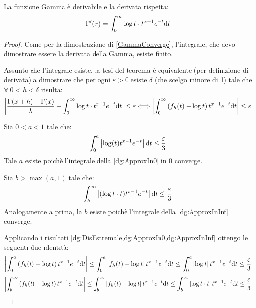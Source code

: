 \begin{theorem}\label{dg:GammaDerivata}
	La funzione Gamma è derivabile e la derivata rispetta:
	\begin{equation*}
		\Gamma'(x)=\int_0^{\infty} \log{t}\cdot t^{x-1}e^{-t}\mathrm{d} t
	\end{equation*}
\end{theorem}
\begin{proof}
	Come per la dimostrazione di \cref{GammaConverge}, l'integrale, che devo dimostrare
	essere la derivata della Gamma, esiste finito.
	
	Assunto che l'integrale esiste, la tesi del teorema è equivalente (per definizione di derivata) a dimostrare
	che per ogni $\varepsilon>0$ esiste $\delta$ (che scelgo minore di 1) tale che $\forall\ 0<h<\delta$ risulta:
	\begin{equation}\label{dg:EpsDeltaDerivata}
		\left\lvert 
		\frac{\Gamma(x+h)-\Gamma(x)}{h}-
		\int_0^{\infty} \log{t}\cdot t^{x-1}e^{-t}\mathrm{d} t
		\right\rvert \le \varepsilon
		\Longleftrightarrow
		\left\lvert
		\int_0^{\infty} \left(f_h(t)-\log{t}\right)t^{x-1}e^{-t}\mathrm{d} t
		\right\rvert \le \varepsilon
	\end{equation}
	
	Sia $0<a<1$ tale che:
	\begin{equation}\label{dg:ApproxIn0}
		\int_0^a \left\lvert \log(t)t^{x-1}e^{-t} \right\rvert \mathrm{d} t \le \frac{\varepsilon}3
	\end{equation}
	Tale $a$ esiste poichè l'integrale della \cref{dg:ApproxIn0} in 0 converge.
	
	Sia $b>\max(a,1)$ tale che:
	\begin{equation}\label{dg:ApproxInInf}
		\int_b^{\infty} \left\lvert (\log{t}\cdot t)t^{x-1}e^{-t}\right\rvert \mathrm{d} t \le \frac{\varepsilon}3
	\end{equation}
	Analogamente a prima, la $b$ esiste poichè l'integrale della \cref{dg:ApproxInInf} converge.
	
	Applicando i risultati \cref{dg:DisEstremale,dg:ApproxIn0,dg:ApproxInInf} ottengo le seguenti due identità:
	\begin{equation}\label{dg:IntIn0}
		\left\lvert \int_0^a \left(f_h(t)-\log{t}\right)t^{x-1}e^{-t}\mathrm{d} t\right\rvert
		\le
		\int_0^a \left\lvert f_h(t)-\log{t} \right\rvert t^{x-1}e^{-t}\mathrm{d} t
		\le
		\int_0^a \left\lvert \log{t} \right\rvert t^{x-1}e^{-t}\mathrm{d} t
		\le
		\frac{\varepsilon}3
	\end{equation}
	\begin{equation}\label{dg:IntInInf}
		\left\lvert \int_b^{\infty} \left(f_h(t)-\log{t}\right)t^{x-1}e^{-t}\mathrm{d} t\right\rvert
		\le
		\int_b^{\infty} \left\lvert f_h(t)-\log{t} \right\rvert t^{x-1}e^{-t}\mathrm{d} t
		\le
		\int_b^{\infty} \left\lvert \log{t}\cdot t\right\rvert t^{x-1}e^{-t}\mathrm{d} t
		\le
		\frac{\varepsilon}3
	\end{equation}
	

\end{proof}
